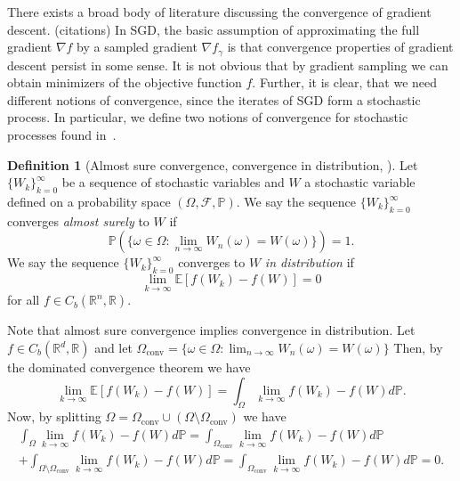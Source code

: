 \documentclass[12pt]{article}
\theoremstyle{definition}
\newtheorem{definition}[definition]{Definition}
\numberwithin{equation}{section}
\newcommand{\R}{\mathbb{R}}
\newcommand{\BP}{\mathbb{P}}
\newcommand{\CF}{\mathcal{F}}
\newcommand{\ev}[1]{\mathbb{E}\left[{#1}\right]}
\begin{document}
There exists a broad body of literature discussing the convergence of gradient descent. (citations) In SGD, the basic assumption of approximating the full gradient $\nabla f$ by a sampled gradient $\nabla f_{\gamma}$ is that convergence properties of gradient descent persist in some sense. It is not obvious that by gradient sampling we can obtain minimizers of the objective function $f$. Further, it is clear, that we need different notions of convergence, since the iterates of SGD form a stochastic process. In particular, we define two notions of convergence for stochastic processes found in~\autocite{eAppliedStochasticAnalysis2021}.
\begin{definition}[Almost sure convergence, convergence in distribution, ]
Let $\{W_k\}_{k=0}^{\infty}$ be a sequence of stochastic variables and $W$ a stochastic variable defined on a probability space $(\Omega, \CF, \BP)$. We say the sequence $\{W_k\}_{k=0}^{\infty}$ converges \emph{almost surely} to $W$ if
\begin{equation}
  \BP(\{\omega \in \Omega : \lim_{n \rightarrow \infty}W_n(\omega) = W(\omega)\}) = 1.
\end{equation}
We say the sequence  $\{W_k\}_{k=0}^{\infty}$ converges to $W$ \emph{in distribution} if
  \begin{equation}
    \lim_{k \rightarrow \infty}\ev{f(W_k) - f(W)} = 0
  \end{equation}
  for all $f \in C_b(\R^n, \R)$.
\end{definition}
Note that almost sure convergence implies convergence in distribution. Let $f \in C_b(\R^d, \R)$ and let $\Omega_{\text{conv}} = \{\omega \in \Omega : \lim_{n \rightarrow \infty}W_n(\omega) = W(\omega)\}$ Then, by the dominated convergence theorem we have 
\begin{equation*}
  \lim_{k \rightarrow \infty} \ev{f(W_k) - f(W)} = \int_{\Omega} \lim_{k \rightarrow \infty} f(W_k) - f(W) d\BP.
\end{equation*}
Now, by splitting $\Omega = \Omega_{\text{conv}} \cup (\Omega \setminus \Omega_{\text{conv}})$ we have
\begin{multline*}
  \int_{\Omega} \lim_{k \rightarrow \infty} f(W_k) - f(W) d\BP 
  =\int_{\Omega_{\text{conv}}} \lim_{k \rightarrow \infty} f(W_k) - f(W) d\BP \\
   + \int_{\Omega \setminus \Omega_{\text{conv}}} \lim_{k \rightarrow \infty} f(W_k) - f(W) d\BP = \int_{\Omega_{\text{conv}}} \lim_{k \rightarrow \infty} f(W_k) - f(W) d\BP = 0.
\end{multline*}
\end{document}
